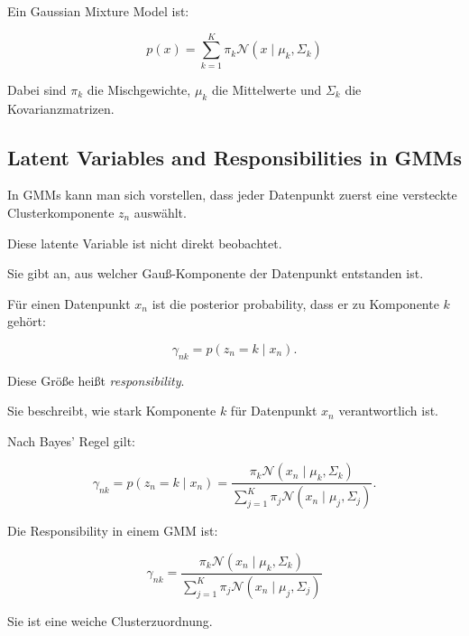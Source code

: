 \documentclass[11pt,a4paper]{scrartcl}
\begin{document}
\begin{answerbox}
    Ein Gaussian Mixture Model ist:

    \[
        \boxed{
            p(x)
            =
            \sum_{k=1}^{K}
            \pi_k
            \mathcal{N}(x\mid \mu_k,\Sigma_k)
        }
    \]

    Dabei sind \(\pi_k\) die Mischgewichte, \(\mu_k\) die Mittelwerte und
    \(\Sigma_k\) die Kovarianzmatrizen.
\end{answerbox}

\subsection{Latent Variables and Responsibilities in GMMs}

\begin{notebox}
    In GMMs kann man sich vorstellen, dass jeder Datenpunkt zuerst eine
    versteckte Clusterkomponente \(z_n\) auswählt.

    Diese latente Variable ist nicht direkt beobachtet.

    Sie gibt an, aus welcher Gauß-Komponente der Datenpunkt entstanden ist.
\end{notebox}

\begin{solutionbox}
    Für einen Datenpunkt \(x_n\) ist die posterior probability, dass er zu
    Komponente \(k\) gehört:

    \[
        \gamma_{nk}
        =
        p(z_n=k \mid x_n).
    \]

    Diese Größe heißt \emph{responsibility}.

    Sie beschreibt, wie stark Komponente \(k\) für Datenpunkt \(x_n\)
    verantwortlich ist.
\end{solutionbox}

\begin{calculationbox}
    Nach Bayes' Regel gilt:

    \[
        \gamma_{nk}
        =
        p(z_n=k \mid x_n)
        =
        \frac{
            \pi_k
            \mathcal{N}(x_n\mid \mu_k,\Sigma_k)
        }{
            \sum_{j=1}^{K}
            \pi_j
            \mathcal{N}(x_n\mid \mu_j,\Sigma_j)
        }.
    \]
\end{calculationbox}

\begin{answerbox}
    Die Responsibility in einem GMM ist:

    \[
        \boxed{
            \gamma_{nk}
            =
            \frac{
                \pi_k
                \mathcal{N}(x_n\mid \mu_k,\Sigma_k)
            }{
                \sum_{j=1}^{K}
                \pi_j
                \mathcal{N}(x_n\mid \mu_j,\Sigma_j)
            }
        }
    \]

    Sie ist eine weiche Clusterzuordnung.
\end{answerbox}
\end{document}
